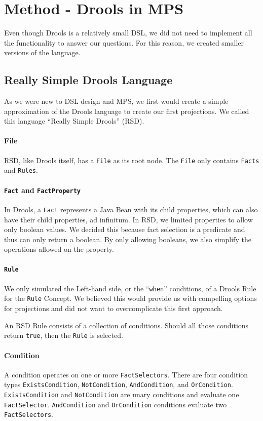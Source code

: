 \section{Method - Drools in MPS}
\label{section:adr_method}

Even though Drools is a relatively small DSL, we did not need to implement all the functionality to answer our questions.
For this reason, we created smaller versions of the language.

\subsection{Really Simple Drools Language}
As we were new to DSL design and MPS, we first would create a simple approximation of the Drools language to create our first projections.
We called this language ``Really Simple Drools'' (RSD).

\paragraph{File} RSD, like Drools itself, has a \texttt{File} as its root node.
The \texttt{File} only contains \texttt{Facts} and \texttt{Rules}.

\paragraph{\texttt{Fact} and \texttt{FactProperty}} In Drools, a \texttt{Fact} represents a Java Bean with its child properties, which can also have their child properties, ad infinitum.
In RSD, we limited properties to allow only boolean values.
We decided this because fact selection is a predicate and thus can only return a boolean.
By only allowing booleans, we also simplify the operations allowed on the property.

\paragraph{\texttt{Rule}} We only simulated the Left-hand side, or the ``\texttt{when}'' conditions, of a Drools Rule for the \texttt{Rule} Concept.
We believed this would provide us with compelling options for projections and did not want to overcomplicate this first approach.

An RSD Rule consists of a collection of conditions.
Should all those conditions return \texttt{true}, then the \texttt{Rule} is selected.

\paragraph{Condition} A condition operates on one or more \texttt{FactSelectors}.
There are four condition types \texttt{ExistsCondition}, \texttt{NotCondition}, \texttt{AndCondition}, and \texttt{OrCondition}.
\texttt{ExistsCondition} and \texttt{NotCondition} are unary conditions and evaluate one \texttt{FactSelector}.
\texttt{AndCondition} and \texttt{OrCondition} conditions evaluate two \texttt{FactSelectors}.

